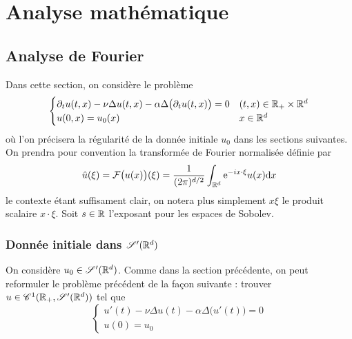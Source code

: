 \section{Analyse mathématique}

\subsection{Analyse de Fourier}

Dans cette section, on considère le problème
\begin{equation*}
    \begin{cases}
        \partial_tu(t,x) - \nu\Delta u(t,x) - \alpha\Delta \big(\partial_t u(t,x)\big) = 0 & (t,x) \in \mathbb R_+ \times \mathbb{R}^d  \\
        u(0,x) = u_0(x) & x \in \mathbb{R}^d
    \end{cases}
\end{equation*}
où l'on précisera la régularité de la donnée initiale $u_0$ dans les sections suivantes. On prendra pour convention la transformée de Fourier \og normalisée \fg{}
définie par
\begin{equation*}
    \hat{u}(\xi)=\mathcal{F}\big(u(x)\big)(\xi) = \frac{1}{(2\pi)^{d/2}}\int_{\mathbb{R}^d} \mathrm{e}^{-ix\cdot\xi}u(x)\mathrm{d}x
\end{equation*}
le contexte étant suffisament clair, on notera plus simplement $x\xi$ le produit scalaire $x \cdot \xi$. Soit $s \in \mathbb{R}$ l'exposant pour les espaces de Sobolev.
\subsubsection{Donnée initiale dans \texorpdfstring{$\mathscr{S}'(\mathbb{R}^d)$}{S'(Rd)}}
On considère $u_0 \in \mathscr{S}'(\mathbb{R}^d)$. Comme dans la section précédente, on peut reformuler le problème précédent de la façon suivante : trouver $u \in \mathscr{C}^1(\mathbb{R}_+, \mathscr{S}'(\mathbb{R}^d))$ tel que 
\begin{equation}\label{pb_RS4}
    \begin{cases}
        u'(t) - \nu\Delta u(t) - \alpha\Delta \big(u'(t)\big) = 0  \\
        u(0) = u_0
    \end{cases}
\end{equation}

